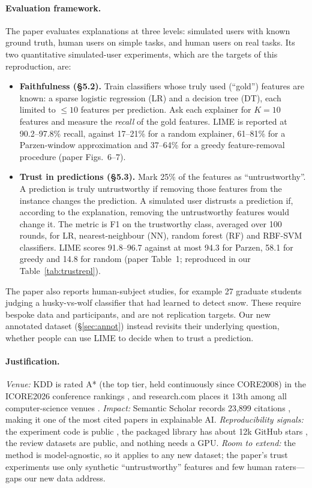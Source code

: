 \documentclass[11pt]{article}
\begin{document}
\paragraph{Evaluation framework.} The paper evaluates explanations at three levels: simulated users with known ground truth, human users on simple tasks, and human users on real tasks. Its two quantitative simulated-user experiments, which are the targets of this reproduction, are:
\begin{itemize}\itemsep0pt
\item \textbf{Faithfulness (\S5.2).} Train classifiers whose truly used (``gold'') features are known: a sparse logistic regression (LR) and a decision tree (DT), each limited to ${\le}10$ features per prediction. Ask each explainer for $K{=}10$ features and measure the \emph{recall} of the gold features. LIME is reported at 90.2--97.8\% recall, against 17--21\% for a random explainer, 61--81\% for a Parzen-window approximation and 37--64\% for a greedy feature-removal procedure (paper Figs.~6--7).
\item \textbf{Trust in predictions (\S5.3).} Mark 25\% of the features as ``untrustworthy''. A prediction is truly untrustworthy if removing those features from the instance changes the prediction. A simulated user distrusts a prediction if, according to the explanation, removing the untrustworthy features would change it. The metric is F1 on the trustworthy class, averaged over 100 rounds, for LR, nearest-neighbour (NN), random forest (RF) and RBF-SVM classifiers. LIME scores 91.8--96.7 against at most 94.3 for Parzen, 58.1 for greedy and 14.8 for random (paper Table~1; reproduced in our Table~\ref{tab:trustrepl}).
\end{itemize}
The paper also reports human-subject studies, for example 27 graduate students judging a husky-vs-wolf classifier that had learned to detect snow. These require bespoke data and participants, and are not replication targets. Our new annotated dataset (\S\ref{sec:annot}) instead revisits their underlying question, whether people can use LIME to decide when to trust a prediction.

\paragraph{Justification.} \emph{Venue:} KDD is rated A* (the top tier, held continuously since CORE2008) in the ICORE2026 conference rankings \citep{icore2026}, and research.com places it 13th among all computer-science venues \citep{researchcom2026}. \emph{Impact:} Semantic Scholar records 23,899 citations \citep{semanticscholar2026}, making it one of the most cited papers in explainable AI. \emph{Reproducibility signals:} the experiment code is public \citep{limeexperiments}, the packaged library has about 12k GitHub stars \citep{limepackage}, the review datasets are public, and nothing needs a GPU. \emph{Room to extend:} the method is model-agnostic, so it applies to any new dataset; the paper's trust experiments use only synthetic ``untrustworthy'' features and few human raters---gaps our new data address.
\end{document}
